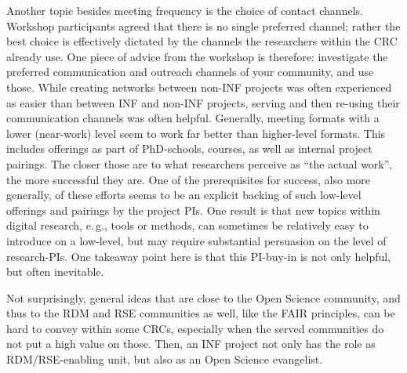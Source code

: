 \documentclass{eceasst}
\newcommand{\eg}{e.\,g.}
\begin{document}
Another topic besides meeting frequency is the choice of contact channels.
Workshop participants agreed that there is no single preferred channel; rather
the best choice is effectively dictated by the channels the researchers within the CRC already use.
One piece of advice from the workshop is therefore: investigate the preferred communication and outreach channels of your community, and use those. 
While creating networks between non-INF projects was often experienced as easier than between INF and non-INF projects, serving and then re-using their communication channels was often helpful.
Generally, meeting formats with a lower (near-work) level seem to work far better than higher-level formats.
This includes offerings as part of PhD-schools, courses, as well as internal project pairings.
The closer those are to what researchers perceive as “the actual work”, the more successful they are.
One of the prerequisites for success, also more generally,
of these efforts seems to be an explicit backing of such low-level offerings and pairings by the project PIs.
One result is that new topics within digital research, \eg, tools or methods, can sometimes be relatively easy to introduce on a low-level, but may require substantial persuasion on the level of research-PIs.
One takeaway point here is that this PI-buy-in is not only helpful, but often inevitable.

Not surprisingly, general ideas that are close to the Open Science community, and thus to the RDM and RSE communities as well, like the FAIR principles,
can be hard to convey within some CRCs, especially when the served communities do not put a high value on those.
Then, an INF project not only has the role as RDM/RSE-enabling unit, but also as an Open Science evangelist.
\vspace{-2.5em}
\end{document}
